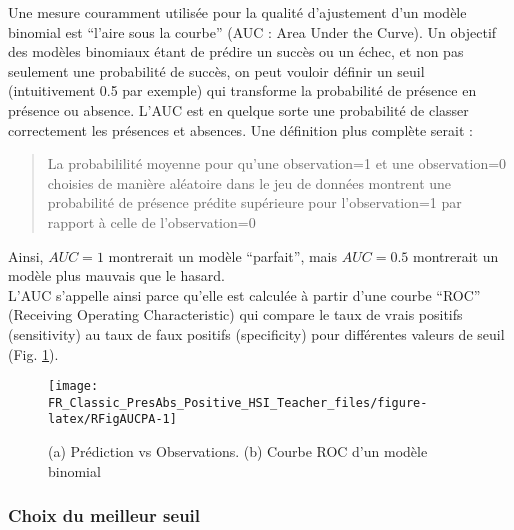 \documentclass[french,a4paper]{article}
\begin{document}
Une mesure couramment utilisée pour la qualité d'ajustement d'un modèle binomial est ``l'aire sous la courbe'' (AUC : Area Under the Curve). Un objectif des modèles binomiaux étant de prédire un succès ou un échec, et non pas seulement une probabilité de succès, on peut vouloir définir un seuil (intuitivement 0.5 par exemple) qui transforme la probabilité de présence en présence ou absence. L'AUC est en quelque sorte une probabilité de classer correctement les présences et absences. Une définition plus complète serait :

\begin{quote}
La probabililité moyenne pour qu'une observation=1 et une observation=0 choisies de manière aléatoire dans le jeu de données montrent une probabilité de présence prédite supérieure pour l'observation=1 par rapport à celle de l'observation=0
\end{quote}

Ainsi, \(AUC = 1\) montrerait un modèle ``parfait'', mais \(AUC = 0.5\) montrerait un modèle plus mauvais que le hasard.\\
L'AUC s'appelle ainsi parce qu'elle est calculée à partir d'une courbe ``ROC'' (Receiving Operating Characteristic) qui compare le taux de vrais positifs (sensitivity) au taux de faux positifs (specificity) pour différentes valeurs de seuil (Fig. \ref{fig:RFigAUCPA}).



\begin{figure}[!h]

{\centering \texttt{[image: FR\_Classic\_PresAbs\_Positive\_HSI\_Teacher\_files/figure-latex/RFigAUCPA-1]} 

}

\caption{(a) Prédiction vs Observations. (b) Courbe ROC d'un modèle binomial}\label{fig:RFigAUCPA}
\end{figure}

\hypertarget{choix-du-meilleur-seuil}{%
\subsubsection{Choix du meilleur seuil}\label{choix-du-meilleur-seuil}}
\end{document}
